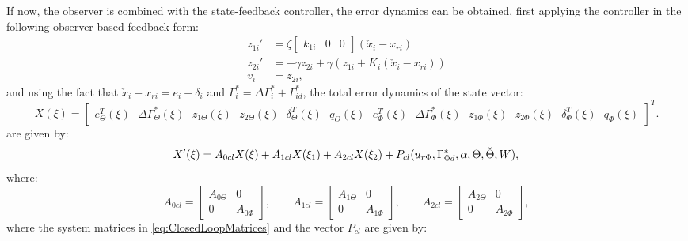 \documentclass[../main.tex]{subfiles}
\begin{document}
	If now, the observer is combined with the state-feedback controller, the error dynamics can be obtained, first applying the controller in the following observer-based feedback form:
	\begin{align}
	z_{1i}' &= \zeta \begin{bmatrix} 
	k_{1i} & 0 & 0
	\end{bmatrix}(\check{x}_i - x_{ri}) \label{eq:controllerlowpasserror}\\
	z_{2i}' &= -\gamma z_{2i}  + \gamma (z_{1i} + K_i(\check{x}_i - x_{ri})) \label{eq:controllerintegralerror}\\
	v_i &= z_{2i} \label{eq:controllerfeedbackerror},
	\end{align}	
	and using the fact that $\check{x}_i - x_{ri} = e_i - \delta_i$ and $\Gamma_i^* = \Delta \Gamma_i^* + \Gamma_{id}^*$, the total error dynamics of the state vector:
	\begin{equation}
	X(\xi) = \begin{bmatrix} 
	e_{\Theta}^T(\xi) \text{ }\Delta \Gamma_\Theta^{*}(\xi) \text{ }z_{1\Theta}(\xi) \text{ } z_{2\Theta}(\xi) \text{ }\delta_{\Theta}^T(\xi) \text{ } q_\Theta(\xi) \text{ }e_{\Phi}^T(\xi) \text{ }\Delta \Gamma_\Phi^*(\xi) \text{ }z_{1\Phi}(\xi) \text{ }z_{2\Phi}(\xi) \text{ }\delta_{\Phi}^T(\xi) \text{ }q_\Phi(\xi)  \nonumber
	\end{bmatrix}^T.
	\end{equation}
	are given by:
	\begin{equation}
	X'(\xi) =	A_{0cl}X(\xi) + A_{1cl}X(\xi_1) + A_{2cl} X(\xi_2) + P_{cl}(u_{r\Phi},\Gamma_{\Phi d}^*,\alpha, \Theta,\check{\Theta},W),\\
	\label{eq:totaldynamics}
	\end{equation}	
	where:
	\begin{equation}
	A_{0cl} = 
	\begin{bmatrix}
	A_{0\Theta} & 0 \\
	0 & A_{0\Phi}
	\end{bmatrix}, \qquad
	A_{1cl} =
	\begin{bmatrix}
	A_{1\Theta} & 0 \\
	0 & A_{1\Phi}
	\end{bmatrix}, \qquad
	A_{2cl} =
	\begin{bmatrix}
	A_{2\Theta} & 0 \\
	0 & A_{2\Phi}
	\end{bmatrix},
	\label{eq:ClosedLoopMatrices}
	\end{equation}
	where the system matrices  in  \eqref{eq:ClosedLoopMatrices} and the vector $P_{cl}$ are given by:
\end{document}
